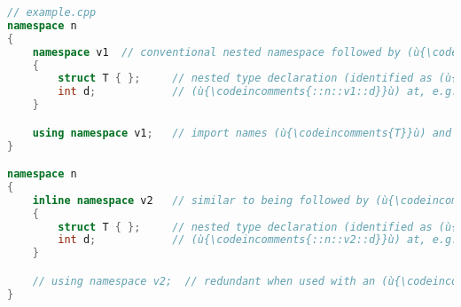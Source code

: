 \begin{lstlisting}[language=C++]
// example.cpp
namespace n
{
    namespace v1  // conventional nested namespace followed by (ù{\codeincomments{using}}ù) directive
    {
        struct T { };     // nested type declaration (identified as (ù{\codeincomments{::n::v1::T}}ù))
        int d;            // (ù{\codeincomments{::n::v1::d}}ù) at, e.g., (ù{\codeincomments{0x01a64e90}}ù)
    }

    using namespace v1;   // import names (ù{\codeincomments{T}}ù) and (ù{\codeincomments{d}}ù) into (ù{\codeincomments{namespace n}}ù)
}

namespace n
{
    inline namespace v2   // similar to being followed by (ù{\codeincomments{using namespace v2}}ù)
    {
        struct T { };     // nested type declaration (identified as (ù{\codeincomments{::n::v2::T}}ù))
        int d;            // (ù{\codeincomments{::n::v2::d}}ù) at, e.g., (ù{\codeincomments{0x01a64e94}}ù)
    }

    // using namespace v2;  // redundant when used with an (ù{\codeincomments{inline namespace}}ù)
}
\end{lstlisting}
    
